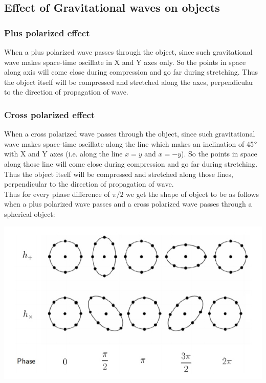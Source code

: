 \subsection{Effect of Gravitational waves on objects}
\subsubsection{Plus polarized effect}
When a plus polarized wave passes through the object, since such gravitational wave makes space-time oscillate in X and Y axes only. So the points in space along axis will come close during compression and go far during stretching. Thus the object itself will be compressed and stretched along the axes, perpendicular to the direction of propagation of wave.

\subsubsection{Cross polarized effect}
When a cross polarized wave passes through the object, since such gravitational wave makes space-time oscillate along the line which makes an inclination of 45$\degree$ with X and Y axes (i.e. along the line $x=y$ and $x=-y$). So the points in space along those line will come close during compression and go far during stretching. Thus the object itself will be compressed and stretched along those lines, perpendicular to the direction of propagation of wave.
\\

Thus for every phase difference of $\pi/2$ we get the shape of object to be as follows
when a plus polarized wave passes and a cross polarized wave passes through a spherical object:

\begin{center}
    \includegraphics[scale=0.5]{images.tex/effect_of_gw.jpeg}
\end{center}
